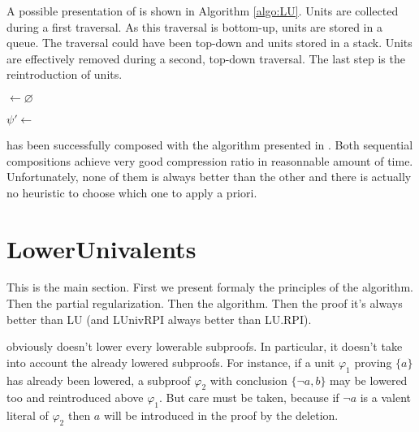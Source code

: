 \documentclass{llncs}
\begin{document}
A possible presentation of {\LowerUnits} is shown in Algorithm \ref{algo:LU}. Units are collected
during a first traversal. As this traversal is bottom-up, units are stored in a queue. The traversal
could have been top-down and units stored in a stack. Units are effectively removed during a second,
top-down traversal. The last step is the reintroduction of units.

\begin{algorithm}[bt]
  \BlankLine

  \Units $\leftarrow \varnothing$ \;
  \BlankLine

  \BlankLine

  $\psi' \leftarrow $ \Rec{$\psi$,$\Units$} \;
  \BlankLine


  \caption{\LowerUnits}
  \label{algo:LU}
\end{algorithm}

{\LowerUnits} has been successfully composed with the {\RPI} algorithm presented in \cite{LURPI}.
Both sequential compositions achieve very good compression ratio in reasonnable amount of time.
Unfortunately, none of them is always better than the other and there is actually no heuristic to
choose which one to apply a priori.

\section{LowerUnivalents}

\begin{jb}
This is the main section. First we present formaly the principles of the algorithm. Then the partial
regularization. Then the algorithm. Then the proof it's always better than LU (and LUnivRPI always
better than LU.RPI).
\end{jb}

{\LowerUnits} obviously doesn't lower every lowerable subproofs. In particular, it doesn't take into
account the already lowered subproofs. For instance, if a unit $\varphi_1$ proving $\{a\}$ has
already been lowered, a subproof $\varphi_2$ with conclusion $\{\neg a,b\}$ may be lowered too and
reintroduced above $\varphi_1$. But care must be taken, because if $\neg a$ is a valent literal of
$\varphi_2$ then $a$ will be introduced in the proof by the deletion.
\end{document}
